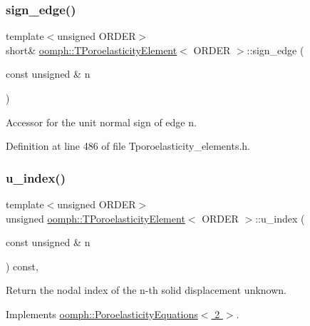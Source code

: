 \subsubsection{\texorpdfstring{sign\+\_\+edge()}{sign\_edge()}\hspace{0.1cm}{\footnotesize\ttfamily [2/2]}}
{\footnotesize\ttfamily template$<$unsigned O\+R\+D\+ER$>$ \\
short\& \hyperlink{classoomph_1_1TPoroelasticityElement}{oomph\+::\+T\+Poroelasticity\+Element}$<$ O\+R\+D\+ER $>$\+::sign\+\_\+edge (\begin{DoxyParamCaption}\item[{const unsigned \&}]{n }\end{DoxyParamCaption})\hspace{0.3cm}{\ttfamily [inline]}}



Accessor for the unit normal sign of edge n. 



Definition at line 486 of file Tporoelasticity\+\_\+elements.\+h.

\mbox{\label{classoomph_1_1TPoroelasticityElement_a23b1b0c75019070b07760815745cd742}} 
\subsubsection{\texorpdfstring{u\+\_\+index()}{u\_index()}}
{\footnotesize\ttfamily template$<$unsigned O\+R\+D\+ER$>$ \\
unsigned \hyperlink{classoomph_1_1TPoroelasticityElement}{oomph\+::\+T\+Poroelasticity\+Element}$<$ O\+R\+D\+ER $>$\+::u\+\_\+index (\begin{DoxyParamCaption}\item[{const unsigned \&}]{n }\end{DoxyParamCaption}) const\hspace{0.3cm}{\ttfamily [inline]}, {\ttfamily [virtual]}}



Return the nodal index of the n-\/th solid displacement unknown. 



Implements \hyperlink{classoomph_1_1PoroelasticityEquations_a3fe57176b22729d251b13e0eb4e7d8fc}{oomph\+::\+Poroelasticity\+Equations$<$ 2 $>$}.



